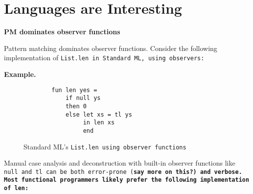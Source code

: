 \documentclass[manuscript,screen,review, 12pt]{acmart}
\begin{document}
\section{Languages are Interesting}
    \begin{outline}[enumerate]
    \1 \bf{PM dominates observer functions}

    Pattern matching dominates observer functions. Consider the following
    implementation of \tt{List.len} in Standard ML, using observers:
    
    
    
    
    
    
    \2 \bf{Example. }

    \begin{figure}[ht!]
        \centering
        \smllst
        \begin{lstlisting}
        fun len yes =
            if null ys 
            then 0 
            else let xs = tl ys 
                 in len xs 
                 end 
        \end{lstlisting}
    \caption{Standard ML's \tt{List.len} using observer functions}
    \label{fig:observerlen}
    \end{figure}
    
    Manual case analysis and deconstruction with built-in observer functions
    like \tt{null} and \tt{tl} can be both error-prone (\bf{say more on this?})
    and verbose. Most functional programmers likely prefer the following
    implementation of \tt{len}:
    \begin{figure}[htt]
        

\end{figure}
\end{outline}
\end{document}
